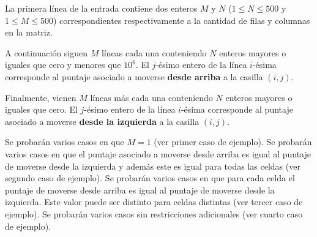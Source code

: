 \documentclass{oci}
\begin{document}
\begin{inputDescription}
  La primera línea de la entrada contiene dos enteros $M$ y $N$ ($1 \leq N \leq 500$ y $1 \leq M \leq 500$)
  correspondientes respectivamente a la cantidad de filas y columnas en la matriz.

  A continuación siguen $M$ líneas cada una conteniendo $N$ enteros mayores o iguales que cero y menores
  que $10^6$.
  El $j$-ésimo entero de la línea $i$-ésima corresponde al puntaje asociado a moverse {\bf desde arriba}
  a la casilla $(i, j)$.

  Finalmente, vienen $M$ líneas más cada una conteniendo $N$ enteros mayores o iguales que cero.
  El $j$-ésimo entero de la línea $i$-ésima corresponde al puntaje asociado a moverse {\bf desde la izquierda}
  a la casilla $(i, j)$.
\end{inputDescription}

\begin{outputDescription}
\end{outputDescription}

\begin{scoreDescription}
  Se probarán varios casos en que $M=1$ (ver primer caso de ejemplo).
  Se probarán varios casos en que el puntaje asociado a moverse desde arriba es igual al puntaje
  de moverse desde la izquierda y además este es igual para todas las celdas
  (ver segundo caso de ejemplo).
  Se probarán varios casos en que para cada celda el puntaje de moverse desde arriba es igual al
  puntaje de moverse desde la izquierda. Este valor puede ser distinto para celdas distintas
  (ver tercer caso de ejemplo).
  Se probarán varios casos sin restricciones adicionales
  (ver cuarto caso de ejemplo).
\end{scoreDescription}

\begin{sampleDescription}
\end{sampleDescription}
\end{document}

